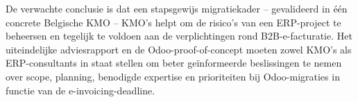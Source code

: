 De verwachte conclusie is dat een stapsgewijs migratiekader – gevalideerd in één concrete Belgische KMO – KMO’s helpt om de risico’s van een ERP-project te beheersen en tegelijk te voldoen aan de verplichtingen rond B2B-e-facturatie. Het uiteindelijke adviesrapport en de Odoo-proof-of-concept moeten zowel KMO’s als ERP-consultants in staat stellen om beter geïnformeerde beslissingen te nemen over scope, planning, benodigde expertise en prioriteiten bij Odoo-migraties in functie van de e-invoicing-deadline.
